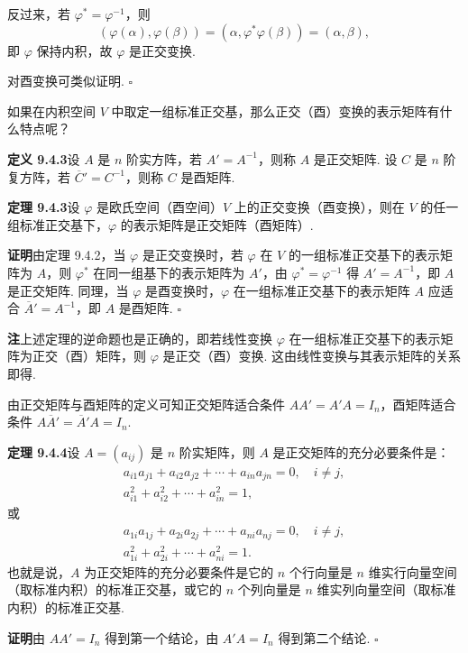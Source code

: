 \documentclass[UTF8,12pt,a4paper,fontset=fandol]{ctexart}
\begin{document}
反过来，若 $\varphi^*=\varphi^{-1}$，则
\[
  (\varphi(\alpha),\varphi(\beta))=(\alpha,\varphi^*\varphi(\beta))=(\alpha,\beta),
\]
即 $\varphi$ 保持内积，故 $\varphi$ 是正交变换.

对酉变换可类似证明. $\square$

如果在内积空间 $V$ 中取定一组标准正交基，那么正交（酉）变换的表示矩阵有什么特点呢？

\noindent\textbf{定义 9.4.3}\quad 设 $A$ 是 $n$ 阶实方阵，若 $A'=A^{-1}$，则称 $A$ 是正交矩阵. 设 $C$ 是 $n$ 阶复方阵，若 $\overline C'=C^{-1}$，则称 $C$ 是酉矩阵.

\noindent\textbf{定理 9.4.3}\quad 设 $\varphi$ 是欧氏空间（酉空间）$V$ 上的正交变换（酉变换），则在 $V$ 的任一组标准正交基下，$\varphi$ 的表示矩阵是正交矩阵（酉矩阵）.

\noindent\textbf{证明}\quad 由定理 9.4.2，当 $\varphi$ 是正交变换时，若 $\varphi$ 在 $V$ 的一组标准正交基下的表示矩阵为 $A$，则 $\varphi^*$ 在同一组基下的表示矩阵为 $A'$，由 $\varphi^*=\varphi^{-1}$ 得 $A'=A^{-1}$，即 $A$ 是正交矩阵. 同理，当 $\varphi$ 是酉变换时，$\varphi$ 在一组标准正交基下的表示矩阵 $A$ 应适合 $\overline A'=A^{-1}$，即 $A$ 是酉矩阵. $\square$

\noindent\textbf{注}\quad 上述定理的逆命题也是正确的，即若线性变换 $\varphi$ 在一组标准正交基下的表示矩阵为正交（酉）矩阵，则 $\varphi$ 是正交（酉）变换. 这由线性变换与其表示矩阵的关系即得.

由正交矩阵与酉矩阵的定义可知正交矩阵适合条件 $AA'=A'A=I_n$，酉矩阵适合条件 $A\overline A'=\overline A'A=I_n$.

\noindent\textbf{定理 9.4.4}\quad 设 $A=(a_{ij})$ 是 $n$ 阶实矩阵，则 $A$ 是正交矩阵的充分必要条件是：
\[
\begin{gathered}
  a_{i1}a_{j1}+a_{i2}a_{j2}+\cdots+a_{in}a_{jn}=0,\quad i\ne j,\\
  a_{i1}^2+a_{i2}^2+\cdots+a_{in}^2=1,
\end{gathered}
\]
或
\[
\begin{gathered}
  a_{1i}a_{1j}+a_{2i}a_{2j}+\cdots+a_{ni}a_{nj}=0,\quad i\ne j,\\
  a_{1i}^2+a_{2i}^2+\cdots+a_{ni}^2=1.
\end{gathered}
\]
也就是说，$A$ 为正交矩阵的充分必要条件是它的 $n$ 个行向量是 $n$ 维实行向量空间（取标准内积）的标准正交基，或它的 $n$ 个列向量是 $n$ 维实列向量空间（取标准内积）的标准正交基.

\noindent\textbf{证明}\quad 由 $AA'=I_n$ 得到第一个结论，由 $A'A=I_n$ 得到第二个结论. $\square$
\end{document}
